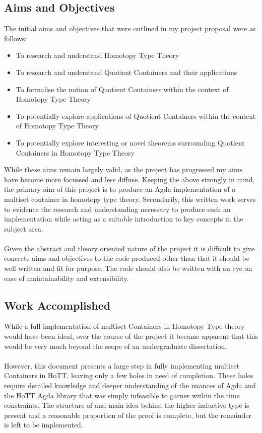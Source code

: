 \documentclass[12pt]{report}
\begin{document}
\subsection*{Aims and Objectives}
The initial aims and objectives that were outlined in my project proposal were as follows:
\begin{itemize}
\item To research and understand Homotopy Type Theory
\item To research and understand Quotient Containers and their applications
\item To formalise the notion of Quotient Containers within the context of Homotopy Type Theory
\item To potentially explore applications of Quotient Containers within the context of Homotopy Type Theory
\item To potentially explore interesting or novel theorems surrounding Quotient Containers in Homotopy Type Theory
\end{itemize}

While these aims remain largely valid, as the project has progressed my aims have become more focussed and less diffuse. Keeping the above strongly in mind, the primary aim of this project is to produce an Agda implementation of a multiset container in homotopy type theory. Secondarily, this  written work serves to evidence the research and understanding necessary to produce such an implementation while acting as a suitable introduction to key concepts in the subject area.\\
\\
Given the abstract and theory oriented nature of the project it is difficult to give concrete aims and objectives to the code produced other than that it should be well written and fit for purpose. The code should also be written with an eye on ease of maintainability and extensibility. 

\subsection*{Work Accomplished}
While a full implementation of multiset Containers in Homotopy Type theory would have been ideal, over the course of the project it became apparent that this would be very much beyond the scope of an undergraduate dissertation.\\
\\
However, this document presents a large step in fully implementing multiset Containers in HoTT, leaving only a few holes in need of completion. These holes require detailed knowledge and deeper understanding of the nuances of Agda and the HoTT Agda library that was simply infeasible to garner within the time constraints. The structure of and main idea behind the higher inductive type is present and a reasonable proportion of the proof is complete, but the remainder is left to be implemented.
\end{document}
